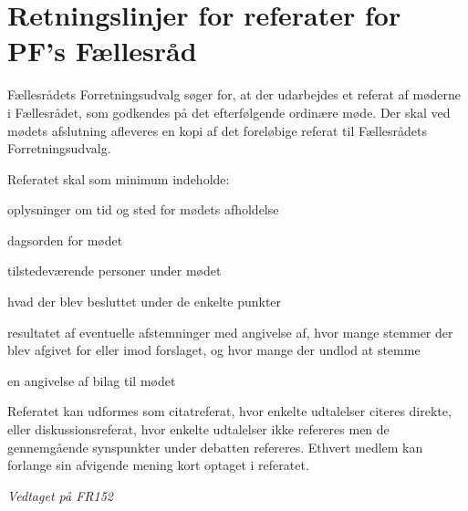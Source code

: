 \section{Retningslinjer for referater for PF’s Fællesråd}
\begin{list}{•}
\item Fællesrådets Forretningsudvalg søger for, at der udarbejdes et referat af møderne i Fællesrådet, som godkendes
        på det efterfølgende ordinære møde. Der skal ved mødets afslutning afleveres en kopi af det foreløbige referat
             til Fællesrådets Forretningsudvalg.
\item Referatet skal som minimum indeholde:
\begin{list}{-}
\item oplysninger om tid og sted for mødets afholdelse
\item dagsorden for mødet
\item tilstedeværende personer under mødet
\item hvad der blev besluttet under de enkelte punkter
\item resultatet af eventuelle afstemninger med angivelse af, hvor mange stemmer der blev afgivet for eller imod forslaget, og hvor mange der undlod at stemme
\item en angivelse af bilag til mødet
\end{list}
\item Referatet kan udformes som citatreferat, hvor enkelte udtalelser citeres direkte, eller diskussionsreferat, hvor enkelte udtalelser ikke refereres men de gennemgående synspunkter under debatten refereres. Ethvert medlem kan forlange sin afvigende  mening kort optaget i referatet.

\end{list}

\textit{Vedtaget på FR152}
